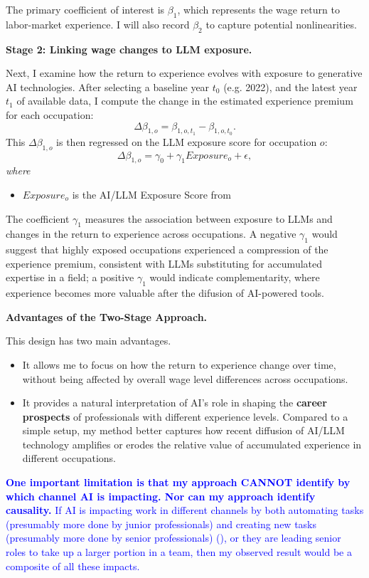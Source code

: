 \documentclass[12pt]{article}
\begin{document}
The primary coefficient of interest is $\beta_{1}$, which represents the wage return to labor-market experience. I will also record $\beta_{2}$ to capture potential nonlinearities. 


\medskip
\noindent \textbf{Stage 2: Linking wage changes to LLM exposure.}

Next, I examine how the return to experience evolves with exposure to generative AI technologies. After selecting a baseline year $t_0$ (e.g. 2022), and the latest year $t_1$ of available data, I compute the change in the estimated experience premium for each occupation:
\[
\Delta \beta_{1,o} = \beta_{1,o,t_1} - \beta_{1,o,t_0}.
\]
This $\Delta \beta_{1,o}$ is then regressed on the LLM exposure score for occupation $o$:
\[
\Delta \beta_{1,o} = \gamma_0 + \gamma_1 Exposure_o + \epsilon,
\]
\textit{where}

\begin{itemize}
    \item $Exposure_o$ is the AI/LLM Exposure Score from \cite{eloundou2024gpts}
\end{itemize}

The coefficient $\gamma_1$ measures the association between exposure to LLMs and changes in the return to experience across occupations. A negative $\gamma_1$ would suggest that highly exposed occupations experienced a compression of the experience premium, consistent with LLMs substituting for accumulated expertise in a field; a positive $\gamma_1$ would indicate complementarity, where experience becomes more valuable after the difusion of AI-powered tools.

\medskip
\noindent \textbf{Advantages of the Two-Stage Approach.}  

This design has two main advantages.
\begin{itemize}
    \item It allows me to focus on how the return to experience change over time, without being affected by overall wage level differences across occupations.
    \item It provides a natural interpretation of AI's role in shaping the \textbf{career prospects} of professionals with different experience levels. Compared to a simple setup, my method better captures how recent diffusion of AI/LLM technology amplifies or erodes the relative value of accumulated experience in different occupations.
\end{itemize}

\textcolor{blue}{\textbf{One important limitation is that my approach CANNOT identify by which channel AI is impacting. Nor can my approach identify causality.} If AI is impacting work in different channels by both automating tasks (presumably more done by junior professionals) and creating new tasks (presumably more done by senior professionals) (\cite{acemoglu2019automation}), or they are leading senior roles to take up a larger portion in a team, then my observed result would be a composite of all these impacts.}
\end{document}
